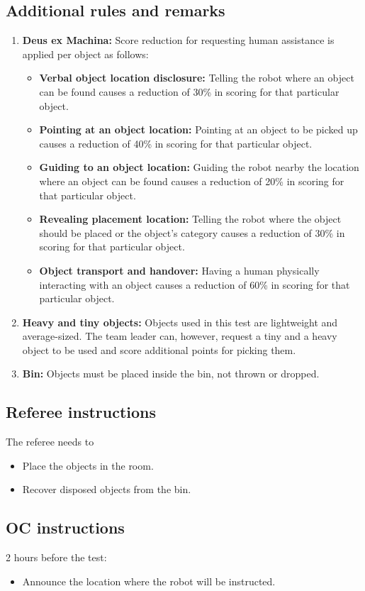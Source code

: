 \subsection{Additional rules and remarks}
\begin{enumerate}[nosep]
	\item \textbf{Deus ex Machina:} Score reduction for requesting human assistance is applied per object as follows:
	\begin{itemize}[nosep]
		\item \textbf{Verbal object location disclosure:} Telling the robot where an object can be found causes a reduction of 30\% in scoring for that particular object.

		\item \textbf{Pointing at an object location:} Pointing at an object to be picked up causes a reduction of 40\% in scoring for that particular object.
		
		\item \textbf{Guiding to an object location:} Guiding the robot nearby the location where an object can be found causes a reduction of 20\% in scoring for that particular object.

		\item \textbf{Revealing placement location:} Telling the robot where the object should be placed or the object's category causes a reduction of 30\% in scoring for that particular object.

		\item \textbf{Object transport and handover:} Having a human physically interacting with an object causes a reduction of 60\% in scoring for that particular object.
	\end{itemize}
	
	\item \textbf{Heavy and tiny objects:} Objects used in this test are lightweight and average-sized.
	The team leader can, however, request a tiny and a heavy object to be used and score additional points for picking them.
	
	\item \textbf{Bin:} Objects must be placed inside the bin, not thrown or dropped.	
\end{enumerate}

\subsection{Referee instructions}
The referee needs to
\begin{itemize}
	\item Place the objects in the room.
	\item Recover disposed objects from the bin.
\end{itemize}

\subsection{OC instructions}
2 hours before the test:
\begin{itemize}
	\item Announce the location where the robot will be instructed.
\end{itemize}